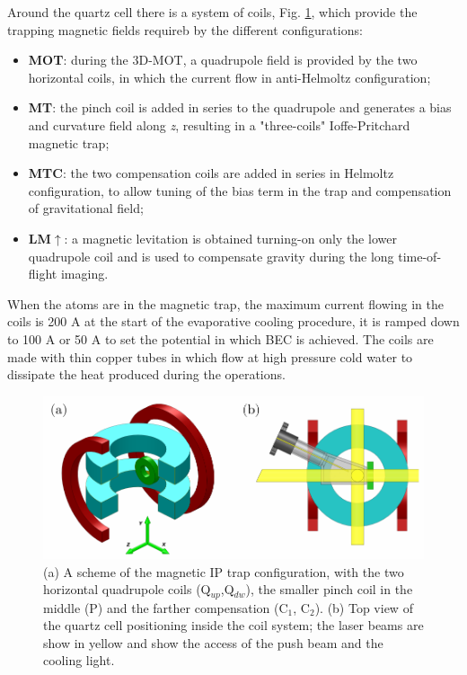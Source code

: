 \documentclass[../thesis.tex]{subfiles}
\begin{document}
Around the quartz cell there is a system of coils, Fig. \ref{fig:sch_mt}, which provide the trapping magnetic fields requireb by the different configurations:

\begin{itemize}
\item \textbf{MOT}: during the 3D-MOT, a quadrupole field is provided by the two horizontal coils, in which the current flow in anti-Helmoltz configuration;
\item \textbf{MT}: the pinch coil is added in series to the quadrupole and generates a bias and curvature field along \textit{z}, resulting in a "three-coils" Ioffe-Pritchard magnetic trap;
\item \textbf{MTC}: the two compensation coils are added in series in Helmoltz configuration, to allow tuning of the bias term in the trap and compensation of gravitational field;
\item \textbf{LM$\uparrow$}: a magnetic levitation is obtained turning-on only the lower quadrupole coil and is used to compensate gravity during the long time-of-flight imaging.
\end{itemize}

When the atoms are in the magnetic trap, the maximum current flowing in the coils is 200 A at the start of the evaporative cooling procedure, it is ramped down to 100 A or 50 A to set the potential in which BEC is achieved. The coils are made with thin copper tubes in which flow at high pressure cold water to dissipate the heat produced during the operations.\\

\begin{figure}[!htb]
\centering
\includegraphics[scale=1]{schematic_mt.pdf}
\caption{(a) A scheme of the magnetic IP trap configuration, with the two horizontal quadrupole coils (Q$_{up}$,Q$_{dw}$), the smaller pinch coil in the middle (P) and the farther compensation (C$_1$, C$_2$). (b) Top view of the quartz cell positioning inside the coil system; the laser beams are show in yellow and show the access of the push beam and the cooling light.}
\label{fig:sch_mt}
\end{figure}
\end{document}

